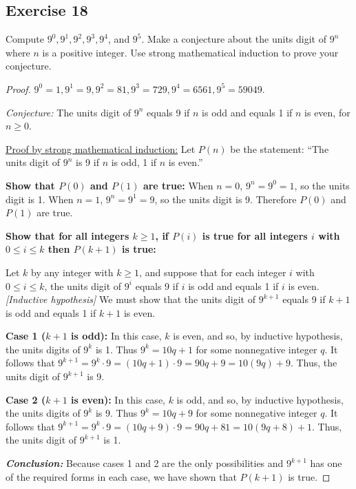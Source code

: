 \documentclass[14pt]{extarticle}
\begin{document}
\subsection{Exercise 18}
Compute $9^0, 9^1, 9^2, 9^3, 9^4$, and $9^5$. Make a conjecture about the units digit of $9^n$ where $n$ is a positive integer. Use strong mathematical induction to prove your conjecture.

\begin{proof}
    $9^0 = 1, 9^1 = 9, 9^2 = 81, 9^3 = 729, 9^4 = 6561, 9^5 = 59049$.

        {\it Conjecture:}
    The units digit of $9^n$ equals 9 if $n$ is odd and equals 1 if $n$ is even, for $n \geq 0$.

    \underline{Proof by strong mathematical induction:}
    Let $P(n)$ be the statement:
    ``The units digit of $9^n$ is 9 if $n$ is odd, 1 if $n$ is even.''

    {\bf Show that $P(0)$ and $P(1)$ are true:}
    When $n = 0$, $9^n = 9^0 = 1$, so the units digit is 1.
    When $n = 1$, $9^n = 9^1 = 9$, so the units digit is 9.
    Therefore $P(0)$ and $P(1)$ are true.

        {\bf Show that for all integers $k \geq 1$, if $P(i)$ is true for all integers $i$ with $0 \leq i \leq k$ then $P(k+1)$ is true:}

    Let $k$ by any integer with $k \geq 1$, and suppose that for each integer $i$
    with $0 \leq i \leq k$, the units digit of $9^i$ equals 9 if $i$ is odd and
    equals 1 if $i$ is even. {\it [Inductive hypothesis]}
    We must show that the units digit of $9^{k+1}$ equals 9
    if $k + 1$ is odd and equals 1 if $k + 1$ is even.

        {\bf Case 1 ($k + 1$ is odd):} In this case, $k$ is even, and so, by inductive
    hypothesis, the units digits of $9^k$ is 1.
    Thus $9^k = 10q + 1$ for some nonnegative integer $q$. It follows that
    $9^{k+1} = 9^k \cdot 9 = (10q + 1) \cdot 9 = 90q + 9 = 10(9q) + 9$.
    Thus, the units digit of $9^{k+1}$ is 9.

        {\bf Case 2 ($k + 1$ is even):} In this case, $k$ is odd, and so, by inductive
    hypothesis, the units digits of $9^k$ is 9.
    Thus $9^k = 10q + 9$ for some nonnegative integer $q$. It follows that
    $9^{k+1} = 9^k \cdot 9 = (10q + 9) \cdot 9 = 90q + 81 = 10(9q + 8) + 1$.
    Thus, the units digit of $9^{k+1}$ is 1.

        {\bf\it Conclusion:} Because cases 1 and 2 are the only
    possibilities and $9^{k+1}$ has one of the required forms
    in each case, we have shown that $P(k + 1)$ is true.
\end{proof}
\end{document}
